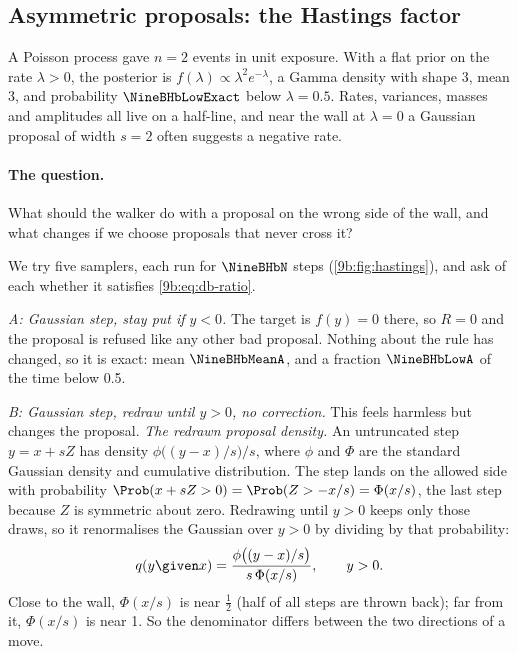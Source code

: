 \subsection{Asymmetric proposals: the Hastings factor}
\label{9b:sec:hastings}

A Poisson process gave $n=2$ events in unit exposure. With a flat prior on the rate $\lambda>0$,
the posterior is $f(\lambda)\propto\lambda^2e^{-\lambda}$, a Gamma density with shape 3, mean 3,
and probability $\NineBHbLowExact$ below $\lambda=0.5$. Rates, variances, masses and amplitudes
all live on a half-line, and near the wall at $\lambda=0$ a Gaussian proposal of width $s=2$
often suggests a negative rate.

\paragraph{The question.} What should the walker do with a proposal on the wrong side of the
wall, and what changes if we choose proposals that never cross it?

We try five samplers, each run for $\NineBHbN$ steps (\cref{9b:fig:hastings}), and ask of each
whether it satisfies \eqref{9b:eq:db-ratio}.

\emph{A: Gaussian step, stay put if $y<0$.} The target is $f(y)=0$ there, so $R=0$ and the
proposal is refused like any other bad proposal. Nothing about the rule has changed, so it is
exact: mean $\NineBHbMeanA$, and a fraction $\NineBHbLowA$ of the time below 0.5.

\emph{B: Gaussian step, redraw until $y>0$, no correction.} This feels harmless but changes the
proposal. \emph{The redrawn proposal density.} An untruncated step $y=x+sZ$ has density
$\phi\bigl((y-x)/s\bigr)/s$, where $\phi$ and $\Phi$ are the standard Gaussian density and
cumulative distribution. The step lands on the allowed side with probability
$\Prob(x+sZ>0)=\Prob(Z>-x/s)=\Phi(x/s)$, the last step because $Z$ is symmetric about zero.
Redrawing until $y>0$ keeps only those draws, so it renormalises the Gaussian over $y>0$ by
dividing by that probability:
\begin{equation}
  q(y\given x)=\frac{\phi\bigl((y-x)/s\bigr)}{s\,\Phi(x/s)},\qquad y>0.
  \label{9b:eq:trunc-q}
\end{equation}
Close to the wall, $\Phi(x/s)$ is near $\tfrac12$ (half of all steps are thrown back); far from
it, $\Phi(x/s)$ is near 1. So the denominator differs between the two directions of a move.

